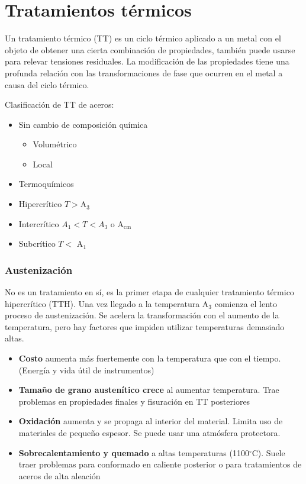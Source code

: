 \documentclass{article}
\newcommand{\Aone}{A\ensuremath{_{1}}}
\newcommand{\Athree}{A\ensuremath{_{3}}}
\newcommand{\Acm}{A\ensuremath{_{\mathrm{cm}}}}
\newcommand{\grad}{\ensuremath{^\circ \mathrm{C}}}
\begin{document}
\part{Tratamientos térmicos}
Un tratamiento térmico (TT) es un ciclo térmico aplicado a un metal con el objeto de obtener una cierta combinación de propiedades, también puede usarse para relevar tensiones residuales. La modificación de las propiedades tiene una profunda relación con las transformaciones de fase que ocurren en el metal a causa del ciclo térmico.

Clasificación de TT de aceros:
\begin{itemize}
    \item Sin cambio de composición química
    \begin{itemize}
        \item Volumétrico
        \item Local
    \end{itemize}
    \item Termoquímicos
    \item Hipercrítico $T>$\Athree~
    \item Intercrítico $\Aone<T<\Athree$ o \Acm~
    \item Subcrítico $T<$ \Aone~
\end{itemize}



\section{Austenización}
No es un tratamiento en sí, es la primer etapa de cualquier tratamiento térmico hipercrítico (TTH). Una vez llegado a la temperatura \Athree{} comienza el lento proceso de austenización. Se acelera la transformación con el aumento de la temperatura, pero hay factores que impiden utilizar temperaturas demasiado altas.

\begin{itemize}
    \item \textbf{Costo} aumenta más fuertemente con la temperatura que con el tiempo. (Energía y vida útil de instrumentos)
    \item \textbf{Tamaño de grano austenítico crece} al aumentar temperatura. Trae problemas en propiedades finales y fisuración en TT posteriores
    \item \textbf{Oxidación} aumenta y se propaga al interior del material. Limita uso de materiales de pequeño espesor. Se puede usar una atmósfera protectora.
    \item \textbf{Sobrecalentamiento y quemado} a altas temperaturas (1100\grad). Suele traer problemas para conformado en caliente posterior o para tratamientos de aceros de alta aleación
\end{itemize}
\end{document}
